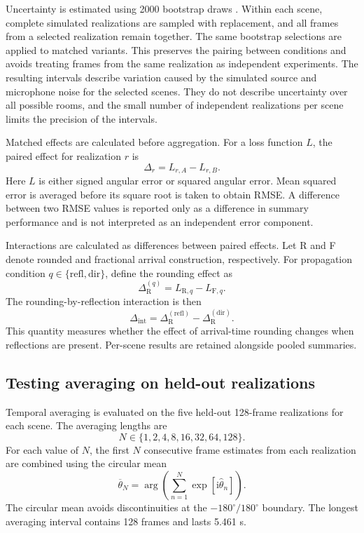 \documentclass{edpsci}
\begin{document}
Uncertainty is estimated using 2000 bootstrap draws \citep{efron}. Within each scene, complete simulated realizations are sampled with replacement, and all frames from a selected realization remain together. The same bootstrap selections are applied to matched variants. This preserves the pairing between conditions and avoids treating frames from the same realization as independent experiments. The resulting intervals describe variation caused by the simulated source and microphone noise for the selected scenes. They do not describe uncertainty over all possible rooms, and the small number of independent realizations per scene limits the precision of the intervals.

Matched effects are calculated before aggregation. For a loss function $L$, the paired effect for realization $r$ is
\begin{equation}
	\Delta_r=L_{r,A}-L_{r,B}.
\end{equation}
Here $L$ is either signed angular error or squared angular error. Mean squared error is averaged before its square root is taken to obtain RMSE. A difference between two RMSE values is reported only as a difference in summary performance and is not interpreted as an independent error component.

Interactions are calculated as differences between paired effects. Let R and F denote rounded and fractional arrival construction, respectively. For propagation condition $q\in\{\mathrm{refl},\mathrm{dir}\}$, define the rounding effect as
\begin{equation}
	\Delta_{\mathrm{R}}^{(q)}
	=
	L_{\mathrm{R},q}-L_{\mathrm{F},q}.
\end{equation}
The rounding-by-reflection interaction is then
\begin{equation}
	\Delta_{\mathrm{int}}
	=
	\Delta_{\mathrm{R}}^{(\mathrm{refl})}
	-
	\Delta_{\mathrm{R}}^{(\mathrm{dir})}.
\end{equation}
This quantity measures whether the effect of arrival-time rounding changes when reflections are present. Per-scene results are retained alongside pooled summaries.

\subsection{Testing averaging on held-out realizations}

Temporal averaging is evaluated on the five held-out 128-frame realizations for each scene. The averaging lengths are
\begin{equation}
	N\in\{1,2,4,8,16,32,64,128\}.
\end{equation}
For each value of $N$, the first $N$ consecutive frame estimates from each realization are combined using the circular mean
\begin{equation}
	\overline{\theta}_N
	=
	\arg\!\left(
	\sum_{n=1}^{N}
	\exp\!\left[\mathrm{i}\widehat{\theta}_n\right]
	\right).
\end{equation}
The circular mean avoids discontinuities at the $-180^\circ/180^\circ$ boundary. The longest averaging interval contains 128 frames and lasts 5.461 s.
\end{document}
